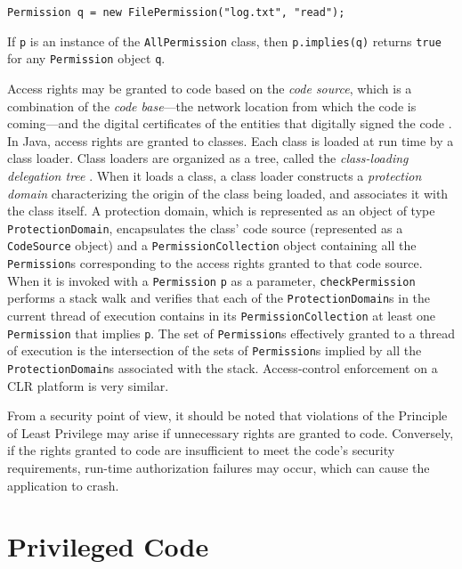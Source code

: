 \begin{tabbing}
	\texttt{Permission q = new FilePermission("log.txt", "read");}
\end{tabbing}

If \texttt{p} is an instance of the \texttt{AllPermission} class,
then \texttt{p.implies(q)} returns \texttt{true} for any
\texttt{Permission} object \texttt{q}.

Access rights may be granted to code based on the \emph{code
	source}, which is a combination of the \emph{code base}---the
network location from which the code is coming---and the digital
certificates of the entities that digitally signed the code
\cite{book:J2SESecBook}. In Java, access rights are granted to
classes.  Each class is loaded at run time by a class loader.
Class loaders are organized as a tree, called the
\emph{class-loading delegation tree} \cite{book:J2EESecBook}. When
it loads a class, a class loader constructs a \emph{protection
	domain} characterizing the origin of the class being loaded, and
associates it with the class itself. A protection domain, which is
represented as an object of type \texttt{ProtectionDomain},
encapsulates the class' code source (represented as a
\texttt{CodeSource} object) and a \texttt{PermissionCollection}
object containing all the \texttt{Permission}s corresponding to
the access rights granted to that code source.  When it is invoked
with a \texttt{Permission} \texttt{p} as a parameter,
\texttt{checkPermission} performs a stack walk and verifies that
each of the \texttt{ProtectionDomain}s in the current thread of
execution contains in its \texttt{PermissionCollection} at least one \texttt{Permission} that implies
\texttt{p}. The set of \texttt{Permission}s effectively granted to
a thread of execution is the intersection of the sets of
\texttt{Permission}s implied by all the \texttt{ProtectionDomain}s
associated with the stack. Access-control enforcement on a CLR
platform is very similar.

From a security point of view, it should be noted that violations
of the Principle of Least Privilege may arise if unnecessary
rights are granted to code.  Conversely, if the rights granted to
code are insufficient to meet the code's security requirements,
run-time authorization failures may occur, which can cause the
application to crash.

\section{Privileged Code} \label{sec:PrivilegedCode}

